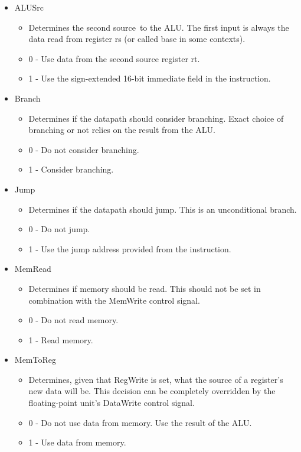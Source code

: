 \documentclass[
    paper=letter,
    parskip=half,
    fontsize=12pt,
    titlepage=firstiscover,
    toc=bibliography,
    numbers=endperiod
]{scrartcl}
\providecommand{\tightlist}{%
  \setlength{\itemsep}{0pt}\setlength{\parskip}{0pt}}
\begin{document}
\begin{itemize}
    \item ALUSrc
    \begin{itemize}
        \tightlist
        \item Determines the second source~to the ALU. The first input is always
            the data read from register rs (or called base in some contexts).
        \item 0 - Use data from the second source register rt.
        \item 1 - Use the sign-extended 16-bit immediate field in the instruction.
    \end{itemize}

    \item Branch
    \begin{itemize}
        \tightlist
        \item Determines if the datapath should consider branching. Exact choice
            of branching or not relies on the result from the ALU.
        \item 0 - Do not consider branching.
        \item 1 - Consider branching.
    \end{itemize}

    \item Jump
    \begin{itemize}
        \tightlist
        \item Determines if the datapath should jump. This is an unconditional branch.
        \item 0 - Do not jump.
        \item 1 - Use the jump address provided from the instruction.
    \end{itemize}

    \item MemRead
    \begin{itemize}
        \tightlist
        \item Determines if memory should be read. This should not be set in
            combination with the MemWrite control signal.
        \item 0 - Do not read memory.
        \item 1 - Read memory.
    \end{itemize}

    \item MemToReg
    \begin{itemize}
        \tightlist
        \item Determines, given that RegWrite is set, what the source of a
            register's new data will be. This decision can be completely
            overridden by the floating-point unit's DataWrite control signal.
        \item 0 - Do not use data from memory. Use the result of the ALU.
        \item 1 - Use data from memory.
    \end{itemize}


\end{itemize}
\end{document}
